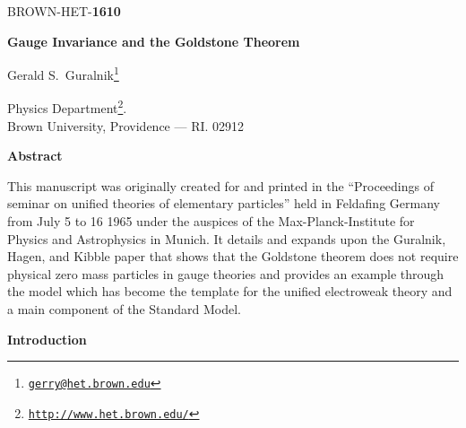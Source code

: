 \documentclass[%
  12pt,
  paper=letter,
  abstracton,
  pagesize=auto,
  version=last,
  DIV=calc
  ]{scrartcl}
\def\textsf{}
\begin{document}
%
\begin{flushright}
  {\textsf{BROWN-HET-\textbf{1610}}}
\end{flushright}
\bigskip

\begin{center}
  {\Large \textbf{\textsf{Gauge Invariance and the Goldstone Theorem}}} \\
  \vspace{0.75in}

  {\Large \textsf{Gerald S.~Guralnik\footnote{\href{mailto:gerry@het.brown.edu}{\texttt{gerry@het.brown.edu}}}}} \\
  \bigskip\bigskip

  \textsf{Physics Department\footnote{\href{http://www.het.brown.edu/}{\texttt{http://www.het.brown.edu/}}}.}\\

  \textsf{Brown University, Providence --- RI. 02912}
\end{center}
\bigskip\bigskip\bigskip

\begin{center}
  \textbf{\textsf{Abstract}}
\end{center}
\bigskip
\noindent This manuscript was originally created for and printed in the
``Proceedings of seminar on unified theories of elementary particles''
held in Feldafing Germany from July 5 to 16 1965 under the auspices
of the Max-Planck-Institute for Physics and Astrophysics in
Munich. It details and expands upon the Guralnik, Hagen, and Kibble
paper that shows that the Goldstone theorem does not require
physical zero mass particles in gauge theories and provides an example through the model which has
become the template for the unified electroweak theory and a main component of the Standard Model.


\newpage
\begin{center}
  \textbf{\textsf{Introduction}}
\end{center}
\bigskip
\end{document}

